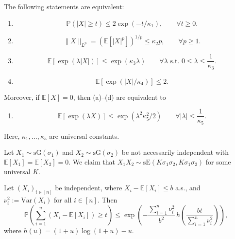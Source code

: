 \begin{thm}
The following statements are equivalent:
\begin{enumerate}
    \item[(a)] 
    \[
    \mathbb{P}(|X| \geq t) \leq 2 \exp(-t / \kappa_1), \qquad \forall t \geq 0.
    \]
    
    \item[(b)] 
    \[
    \|X\|_{L^p} = \left( \mathbb{E}[|X|^p] \right)^{1/p} \leq \kappa_2 p, \qquad \forall p \geq 1.
    \]
    
    \item[(c)] 
    \[
    \mathbb{E}[\exp(\lambda |X|)] \leq \exp(\kappa_3 \lambda) \qquad \forall \lambda \text{ s.t. } 0 \leq \lambda \leq \frac{1}{\kappa_3}.
    \]
    
    \item[(d)] 
    \[
    \mathbb{E}[\exp(|X| / \kappa_4)] \leq 2.
    \]
\end{enumerate}

Moreover, if $\mathbb{E}[X] = 0$, then (a)--(d) are equivalent to
\begin{enumerate}
    \item[(e)] 
    \[
    \mathbb{E}[\exp(\lambda X)] \leq \exp(\lambda^2 \kappa_5^2 / 2) \qquad \forall |\lambda| \leq \frac{1}{\kappa_5}.
    \]
\end{enumerate}

Here, $\kappa_1, \ldots, \kappa_5$ are universal constants.
\end{thm}

\begin{exam}
Let $X_1 \sim \mathrm{sG}(\sigma_1)$ and $X_2 \sim \mathrm{sG}(\sigma_2)$ be not necessarily independent with $\mathbb{E}[X_1] = \mathbb{E}[X_2] = 0$. We claim that $X_1 X_2 \sim \mathrm{sE}(K \sigma_1 \sigma_2, K \sigma_1 \sigma_2)$ for some universal $K$.
\end{exam}

\begin{lem}
Let $(X_i)_{i \in [n]}$ be independent, where $X_i - \mathbb{E}[X_i] \leq b$ a.s., and $\nu_i^2 := \mathrm{Var}(X_i)$ for all $i \in [n]$. Then
\[
\mathbb{P}\!\left( \sum_{i=1}^n (X_i - \mathbb{E}[X_i]) \geq t \right) \leq \exp\!\left( -\frac{\sum_{i=1}^n \nu_i^2}{b^2} \, h\!\left( \frac{b t}{\sum_{i=1}^n \nu_i^2} \right) \right),
\]
where $h(u) = (1 + u) \log(1 + u) - u$.
\end{lem}

